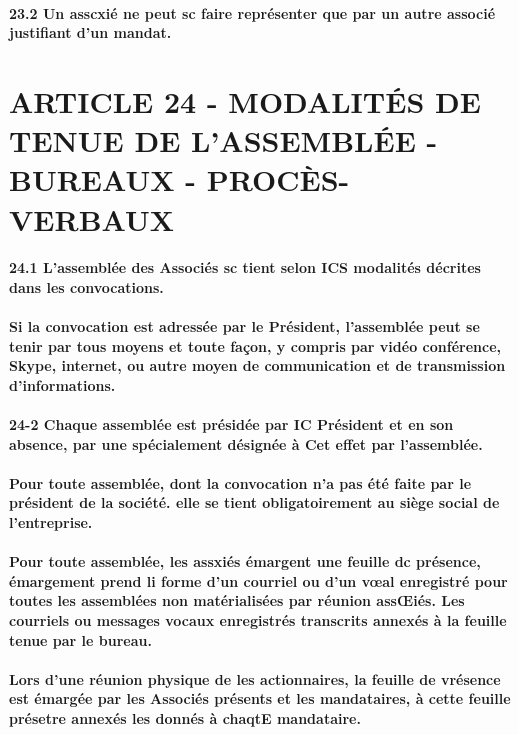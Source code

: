\documentclass[a4paper, 11pt]{article}
\begin{document}
\paragraph{
  23.2 Un asscxié ne peut sc faire représenter que par un autre associé justifiant d'un mandat.
}

\section*{ARTICLE 24 - MODALITÉS DE TENUE DE L'ASSEMBLÉE - BUREAUX - PROCÈS-VERBAUX}

\paragraph{
  24.1 L'assemblée des Associés sc tient selon ICS modalités décrites dans les convocations.
}

\paragraph{
  Si la convocation est adressée par le Président, l'assemblée peut se tenir par tous moyens et toute façon, y compris par vidéo conférence, Skype, internet, ou autre moyen de communication et de transmission d'informations.
}

\paragraph{
  24-2 Chaque assemblée est présidée par IC Président et en son absence, par une spécialement désignée à Cet effet par l'assemblée.
}

\paragraph{
  Pour toute assemblée, dont la convocation n'a pas été faite par le président de la société. elle se tient obligatoirement au siège social de l'entreprise.
}

\paragraph{
  Pour toute assemblée, les assxiés émargent une feuille dc présence, émargement prend li forme d'un courriel ou d'un vœal enregistré pour toutes les assemblées non matérialisées par réunion assŒiés. Les courriels ou messages vocaux enregistrés transcrits annexés à la feuille tenue par le bureau.
}

\paragraph{
  Lors d'une réunion physique de les actionnaires, la feuille de vrésence est émargée par les Associés présents et les mandataires, à cette feuille présetre annexés les donnés à chaqtE mandataire.
}
\end{document}
